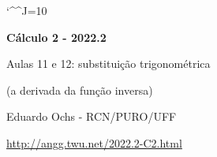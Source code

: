\documentclass[oneside,12pt]{article}
\begin{document}
\catcode`\^^J=10
\pu
\def\pictgridstyle{\color{GrayPale}\linethickness{0.3pt}}
\def\pictaxesstyle{\linethickness{0.5pt}}
\def\pictnaxesstyle{\color{GrayPale}\linethickness{0.5pt}}
\celllower=2.5pt


\def\u#1{\par{\footnotesize \url{#1}}}

\def\drafturl{http://angg.twu.net/LATEX/2022-2-C2.pdf}
\def\drafturl{http://angg.twu.net/2022.2-C2.html}
\def\draftfooter{\tiny \href{\drafturl}{\jobname{}} \ColorBrown{\shorttoday{} \hours}}

\def\P#1{\left(#1\right#1}
\def\Rq{\ColorRed{?}}



%

\thispagestyle{empty}

\begin{center}

\vspace*{1.2cm}

{\bf \Large Cálculo 2 - 2022.2}

\bsk

Aulas 11 e 12: substituição trigonométrica

(a derivada da função inversa)

\bsk

Eduardo Ochs - RCN/PURO/UFF

\url{http://angg.twu.net/2022.2-C2.html}

\end{center}

\newpage

\end{document}
